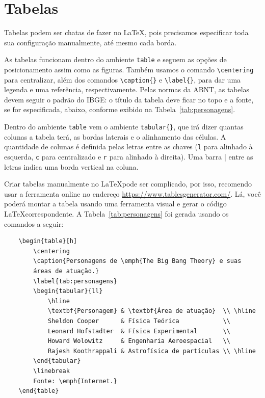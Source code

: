 \section{Tabelas}
\label{sec:tabelas}

Tabelas podem ser chatas de fazer no \LaTeX, pois precisamos especificar toda sua configuração manualmente, até mesmo cada borda.

As tabelas funcionam dentro do ambiente \verb=table= e seguem as opções de posicionamento assim como as figuras. Também usamos o comando \verb=\centering= para centralizar, além dos comandos \verb=\caption{}= e \verb=\label{}=, para dar uma legenda e uma referência, respectivamente. Pelas normas da ABNT, as tabelas devem seguir o padrão do IBGE: o título da tabela deve ficar no topo e a fonte, se for especificada, abaixo, conforme exibido na Tabela~\ref{tab:personagens}.

Dentro do ambiente \verb=table= vem o ambiente \verb=tabular{}=, que irá dizer quantas colunas a tabela terá, as bordas laterais e o alinhamento das células. A quantidade de colunas é definida pelas letras entre as chaves (\verb=l= para alinhado à esquerda, \verb=c= para centralizado e \verb=r= para alinhado à direita). Uma barra | entre as letras indica uma borda vertical na coluna.

Criar tabelas manualmente no \LaTeX\space pode ser complicado, por isso, recomendo usar a ferramenta online no endereço \url{https://www.tablesgenerator.com/}. Lá, você poderá montar a tabela usando uma ferramenta visual e gerar o código \LaTeX\space correspondente. A Tabela~\ref{tab:personagens} foi gerada usando os comandos a seguir:

\begin{verbatim}
    \begin{table}[h]
        \centering
        \caption{Personagens de \emph{The Big Bang Theory} e suas
        áreas de atuação.}
        \label{tab:personagens}
        \begin{tabular}{ll}
            \hline
            \textbf{Personagem} & \textbf{Área de atuação}  \\ \hline
            Sheldon Cooper      & Física Teórica            \\
            Leonard Hofstadter  & Física Experimental       \\
            Howard Wolowitz     & Engenharia Aeroespacial   \\
            Rajesh Koothrappali & Astrofísica de partículas \\ \hline
        \end{tabular}
        \linebreak
        Fonte: \emph{Internet.}
    \end{table}
\end{verbatim}

